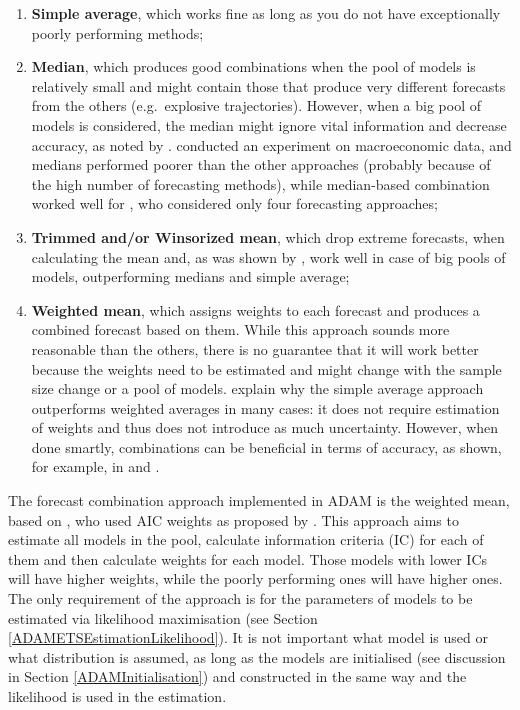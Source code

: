 \documentclass[]{book}
\providecommand{\tightlist}{%
  \setlength{\itemsep}{0pt}\setlength{\parskip}{0pt}}
\theoremstyle{definition}
\theoremstyle{definition}
\theoremstyle{definition}
\theoremstyle{definition}
\theoremstyle{remark}
\begin{document}
\begin{enumerate}
\def\labelenumi{\arabic{enumi}.}
\tightlist
\item
  \textbf{Simple average}, which works fine as long as you do not have exceptionally poorly performing methods;
\item
  \textbf{Median}, which produces good combinations when the pool of models is relatively small and might contain those that produce very different forecasts from the others (e.g.~explosive trajectories). However, when a big pool of models is considered, the median might ignore vital information and decrease accuracy, as noted by \citet{Jose2008}. \citet{Stock2004} conducted an experiment on macroeconomic data, and medians performed poorer than the other approaches (probably because of the high number of forecasting methods), while median-based combination worked well for \citet{Petropoulos2020}, who considered only four forecasting approaches;
\item
  \textbf{Trimmed and/or Winsorized mean}, which drop extreme forecasts, when calculating the mean and, as was shown by \citet{Jose2008}, work well in case of big pools of models, outperforming medians and simple average;
\item
  \textbf{Weighted mean}, which assigns weights to each forecast and produces a combined forecast based on them. While this approach sounds more reasonable than the others, there is no guarantee that it will work better because the weights need to be estimated and might change with the sample size change or a pool of models. \citet{Claeskens2016} explain why the simple average approach outperforms weighted averages in many cases: it does not require estimation of weights and thus does not introduce as much uncertainty. However, when done smartly, combinations can be beneficial in terms of accuracy, as shown, for example, in \citet{Kolassa2011} and \citet{Kourentzes2019c}.
\end{enumerate}

The forecast combination approach implemented in ADAM is the weighted mean, based on \citet{Kolassa2011}, who used AIC weights as proposed by \citet{Burnham2004}. This approach aims to estimate all models in the pool, calculate information criteria (IC) for each of them \citep[see discussion in Section 13.4 in][]{SvetunkovSBA} and then calculate weights for each model. Those models with lower ICs will have higher weights, while the poorly performing ones will have higher ones. The only requirement of the approach is for the parameters of models to be estimated via likelihood maximisation (see Section \ref{ADAMETSEstimationLikelihood}). It is not important what model is used or what distribution is assumed, as long as the models are initialised (see discussion in Section \ref{ADAMInitialisation}) and constructed in the same way and the likelihood is used in the estimation.
\end{document}
